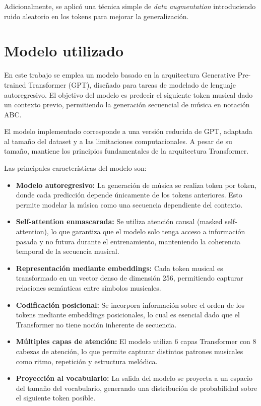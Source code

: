 \documentclass[conference]{IEEEtran}
\begin{document}
Adicionalmente, se aplicó una técnica simple de \textit{data augmentation} introduciendo ruido aleatorio en los tokens para mejorar la generalización.

\section{Modelo utilizado}

En este trabajo se emplea un modelo basado en la arquitectura Generative Pre-trained Transformer (GPT), diseñado para tareas de modelado de lenguaje autoregresivo. El objetivo del modelo es predecir el siguiente token musical dado un contexto previo, permitiendo la generación secuencial de música en notación ABC.

El modelo implementado corresponde a una versión reducida de GPT, adaptada al tamaño del dataset y a las limitaciones computacionales. A pesar de su tamaño, mantiene los principios fundamentales de la arquitectura Transformer.

Las principales características del modelo son:

\begin{itemize}

\item \textbf{Modelo autoregresivo:} La generación de música se realiza token por token, donde cada predicción depende únicamente de los tokens anteriores. Esto permite modelar la música como una secuencia dependiente del contexto.

\item \textbf{Self-attention enmascarada:} Se utiliza atención causal (masked self-attention), lo que garantiza que el modelo solo tenga acceso a información pasada y no futura durante el entrenamiento, manteniendo la coherencia temporal de la secuencia musical.

\item \textbf{Representación mediante embeddings:} Cada token musical es transformado en un vector denso de dimensión 256, permitiendo capturar relaciones semánticas entre símbolos musicales.

\item \textbf{Codificación posicional:} Se incorpora información sobre el orden de los tokens mediante embeddings posicionales, lo cual es esencial dado que el Transformer no tiene noción inherente de secuencia.

\item \textbf{Múltiples capas de atención:} El modelo utiliza 6 capas Transformer con 8 cabezas de atención, lo que permite capturar distintos patrones musicales como ritmo, repetición y estructura melódica.

\item \textbf{Proyección al vocabulario:} La salida del modelo se proyecta a un espacio del tamaño del vocabulario, generando una distribución de probabilidad sobre el siguiente token posible.

\end{itemize}
\end{document}
